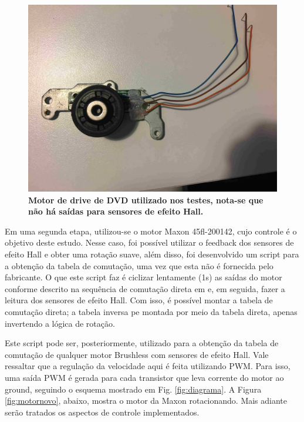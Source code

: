 \documentclass[10pt,fleqn,a4paper]{article}
\begin{document}
	\begin{figure}[ht]
		\begin{center}
			\includegraphics[angle=0, scale=0.06]{images/motorantigo}
		\end{center}
		\caption{\textbf{Motor de drive de DVD utilizado nos testes, nota-se que não há saídas para sensores de efeito Hall.}}
		\label{fig:motorantigo}
	\end{figure}
    
    Em uma segunda etapa, utilizou-se o motor Maxon 45fl-200142, cujo controle é o objetivo deste estudo. Nesse caso, foi possível utilizar o feedback dos sensores de efeito Hall e obter uma rotação suave, além disso, foi desenvolvido um script para a obtenção da tabela de comutação, uma vez que esta não é fornecida pelo fabricante. O que este script faz é ciclizar lentamente (1s) as saídas do motor conforme descrito na sequência de comutação direta em \cite{atmeldiagrama} e, em seguida, fazer a leitura dos sensores de efeito Hall. Com isso, é possível montar a tabela de comutação direta; a tabela inversa pe montada por meio da tabela direta, apenas invertendo a lógica de rotação.
    
    Este script pode ser, posteriormente, utilizado para a obtenção da tabela de comutação de qualquer motor Brushless com sensores de efeito Hall. Vale ressaltar que a regulação da velocidade aqui é feita utilizando PWM. Para isso, uma saída PWM é gerada para cada transistor que leva corrente do motor ao ground, seguindo o esquema mostrado em Fig. \ref{fig:diagrama}.
    A Figura \ref{fig:motornovo}, abaixo, mostra o motor da Maxon rotacionando. Mais adiante serão tratados os aspectos de controle implementados.
\end{document}
